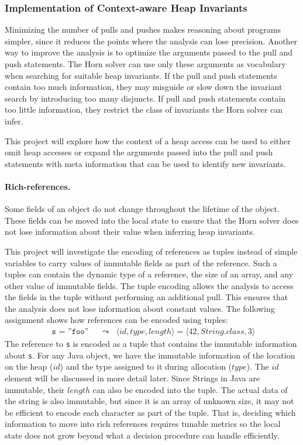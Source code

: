 \subsubsection{Implementation of Context-aware Heap Invariants}
Minimizing the number of pulls and pushes makes reasoning about programs 
simpler, since it reduces the points where the analysis can lose precision.
Another way to improve the analysis is to optimize the 
arguments passed to the 
pull and push statements. The Horn solver can use only these arguments
 as vocabulary when searching for suitable heap 
invariants. If the pull and push statements contain too much information, 
they may misguide or slow down the invariant search by introducing too many
disjuncts. If pull and push statements contain too little
information, they restrict the class of invariants the Horn solver can infer. 

This project will explore how the context of a heap access can be used to 
either omit heap accesses or expand the arguments passed into the 
pull and push statements with meta information that can be used to identify
new invariants.

\paragraph{Rich-references.} Some fields of an object do not change 
throughout the lifetime of the object. These fields can be moved into the
local state to ensure that the Horn solver does not lose information about
their value when inferring heap invariants.

This project will investigate the encoding of references
as tuples instead of simple variables to carry values of immutable fields as 
part of the reference. 
Such a tuples can contain the dynamic type of a reference, the size of an array,
and any other value of immutable fields. The tuple encoding allows the analysis
to access the fields in the tuple without performing an additional pull. This
ensures that 
the analysis does not lose information about constant values.
The following 
assignment shows how references can be encoded using tuples:
\begin{align*}
\texttt{ s = ''foo''}\, & ~~\leadsto~~ \, 
\langle id, type, length \rangle = \langle 42, String.class, 3\rangle
\end{align*}
The reference to \texttt{s} is encoded as a tuple that contains the 
immutable information about \texttt{s}. For any Java object, we have the 
immutable information of the location on the heap ($id$) and the
type assigned to it during allocation ($type$). The $id$ element 
will be discussed in more detail later.
Since Strings in 
Java are immutable, their $length$ can also be encoded into the tuple. 
The actual data of the string is also immutable, but since it is
an array of unknown size, it may not be efficient to encode each 
character as part of the tuple. That is, deciding which information to
move into rich references requires tunable metrics so the local
state does not grow beyond what a decision procedure can handle efficiently.

